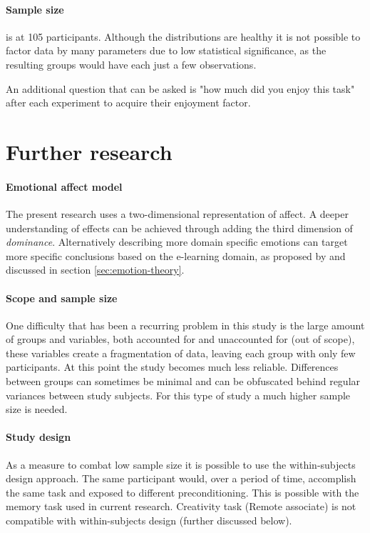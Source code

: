 		
	 \paragraph{Sample size} is at 105 participants. Although the distributions are healthy it is not possible to factor data by many parameters due to low statistical significance, as the resulting groups would have each just a few observations.
	
	
	
	An additional question that can be asked is "how much did you enjoy this task" after each experiment to acquire their enjoyment factor.
	
	

\section{Further research} \label{sec:further-research}

\paragraph{Emotional affect model} The present research uses a two-dimensional representation of affect. A deeper understanding of effects can be achieved through adding the third dimension of \textit{dominance}. Alternatively describing more domain specific emotions can target more specific conclusions based on the e-learning domain, as proposed by \cite{SreejaPSMahalakshmi2017} and discussed in section \ref{sec:emotion-theory}.

\paragraph{Scope and sample size}
One difficulty that has been a recurring problem in this study is the large amount of groups and variables, both accounted for and unaccounted for (out of scope), these variables create a fragmentation of data, leaving each group with only few participants. At this point the study becomes much less reliable. Differences between groups can sometimes be minimal and can be obfuscated behind regular variances between study subjects. For this type of study a much higher sample size is needed.

\paragraph{Study design} As a measure to combat low sample size it is possible to use the within-subjects design approach. The same participant would, over a period of time, accomplish the same task and exposed to different preconditioning. This is possible with the memory task used in current research. Creativity task (Remote associate) is not compatible with within-subjects design (further discussed below).

